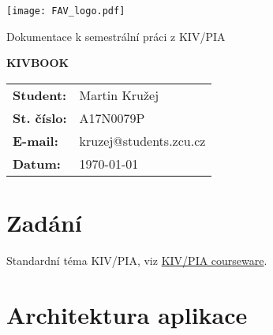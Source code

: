\documentclass[
12pt,
a4paper,
pdftex,
czech,
titlepage
]{report}
\begin{document}
\begin{titlepage}
	\vspace*{-2cm}
	{\centering\texttt{[image: FAV\_logo.pdf]}\par}
	\centering
	\vspace*{2cm}
	{\Large Dokumentace k semestrální práci z KIV/PIA\par}
	\vspace{1.0cm}
	{\Huge\bfseries KIVBOOK\par}
	\vspace{7cm}

	\begin{flushleft} 
	\begin{table}[ht]
	\label{stats}
	\begin{tabular}{ll}
	\textbf{Student:}  & Martin Kružej   \\
	\textbf{St. číslo:}   & A17N0079P    \\
	\textbf{E-mail:}  & kruzej@students.zcu.cz  \\
	\textbf{Datum:}    & \today            \\ 
	\end{tabular}
	\end{table}
	\end{flushleft}
	
	\vfill


\end{titlepage}

\tableofcontents
\thispagestyle{empty}
\clearpage

\chapter{Zadání}
\setcounter{page}{1}

Standardní téma KIV/PIA, viz \href{https://courseware.zcu.cz/portal/studium/courseware/kiv/pia/samostatna-prace/standardni-tema.html}{KIV/PIA courseware}.

\chapter{Architektura aplikace}
\end{document}
